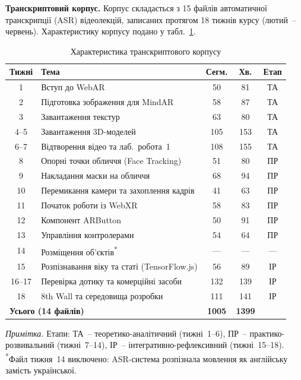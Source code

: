 \textbf{Транскриптовий корпус.} Корпус складається з 15 файлів автоматичної транскрипції (ASR) відеолекцій, записаних протягом 18 тижнів курсу (лютий~-- червень). Характеристику корпусу подано у табл.~\ref{tab:corpus}.

\begin{table}[!h]
\centering
\caption{Характеристика транскриптового корпусу}
\label{tab:corpus}
\small
\begin{tabular}{|c|l|c|c|c|}
\hline
\textbf{Тижні} & \hfill \textbf{Тема} & \textbf{Сегм.} & \textbf{Хв.} & \textbf{Етап} \\
\hline
1 & Вступ до WebAR & 50 & 81 & ТА \\
\hline
2 & Підготовка зображення для MindAR & 58 & 87 & ТА \\
\hline
3 & Завантаження текстур & 63 & 80 & ТА \\
\hline
4--5 & Завантаження 3D-моделей & 105 & 153 & ТА \\
\hline
6--7 & Відтворення відео та лаб.~робота~1 & 108 & 155 & ТА \\
\hline
8 & Опорні точки обличчя (Face Tracking) & 51 & 80 & ПР \\
\hline
9 & Накладання маски на обличчя & 68 & 94 & ПР \\
\hline
10 & Перемикання камери та захоплення кадрів & 41 & 63 & ПР \\
\hline
11 & Початок роботи із WebXR & 58 & 83 & ПР \\
\hline
12 & Компонент ARButton & 50 & 91 & ПР \\
\hline
13 & Управління контролерами & 54 & 64 & ПР \\
\hline
14 & Розміщення об'єктів\textsuperscript{*} & --- & --- & --- \\
\hline
15 & Розпізнавання віку та статі (TensorFlow.js) & 56 & 89 & ІР \\
\hline
16--17 & Перевірка дотику та комерційні засоби & 132 & 139 & ІР \\
\hline
18 & 8th Wall та середовища розробки & 111 & 141 & ІР \\
\hline
\multicolumn{2}{|l|}{\textbf{Усього (14 файлів)}} & \textbf{1005} & \textbf{1399} & \\
\hline
\end{tabular}

\medskip
\footnotesize
\textit{Примітка.} Етапи: ТА~-- теоретико-аналітичний (тижні~1--6), ПР~-- практико-розвивальний (тижні~7--14), ІР~-- інтегративно-рефлексивний (тижні~15--18). \textsuperscript{*}Файл тижня~14 виключено: ASR-система розпізнала мовлення як англійську замість української.
\end{table}


